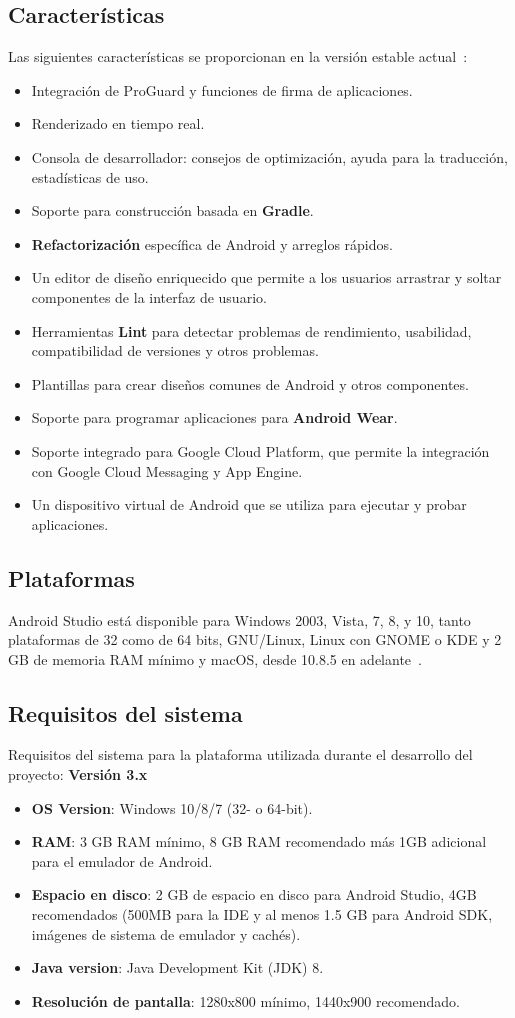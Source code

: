 \subsection{Características}
Las siguientes características se proporcionan en la versión estable actual~\cite{wiki:androidStudio}:
\begin{itemize}
	\item Integración de ProGuard y funciones de firma de aplicaciones.
	\item Renderizado en tiempo real.
	\item Consola de desarrollador: consejos de optimización, ayuda para la traducción, estadísticas de uso.
	\item Soporte para construcción basada en \textbf{Gradle}.
	\item \textbf{Refactorización} específica de Android y arreglos rápidos.
	\item Un editor de diseño enriquecido que permite a los usuarios arrastrar y soltar componentes de la interfaz de usuario.
	\item Herramientas \textbf{Lint} para detectar problemas de rendimiento, usabilidad, compatibilidad de versiones y otros problemas.
	\item Plantillas para crear diseños comunes de Android y otros componentes.
	\item Soporte para programar aplicaciones para \textbf{Android Wear}.
	\item Soporte integrado para Google Cloud Platform, que permite la integración con Google Cloud Messaging y App Engine.
	\item Un dispositivo virtual de Android que se utiliza para ejecutar y probar aplicaciones.
\end{itemize}
\subsection{Plataformas}
Android Studio está disponible para Windows 2003, Vista, 7, 8, y 10, tanto plataformas de 32 como de 64 bits, GNU/Linux, Linux con GNOME o KDE y 2 GB de memoria RAM mínimo y macOS, desde 10.8.5 en adelante~\cite{wiki:androidStudio}.
\subsection{Requisitos del sistema}
 Requisitos del sistema para la plataforma utilizada durante el desarrollo del proyecto: \textbf{Versión 3.x}~\cite{wiki:androidStudio}
 \begin{itemize}
 	\item\textbf{OS Version}: Windows 10/8/7 (32- o 64-bit). 
 	\item\textbf{RAM}: 3 GB RAM mínimo, 8 GB RAM recomendado más 1GB adicional para el emulador de Android.
 	\item\textbf{Espacio en disco}: 2 GB de espacio en disco para Android Studio, 4GB recomendados (500MB para la IDE y al menos 1.5 GB para Android SDK, imágenes de sistema de emulador y cachés).
 	\item\textbf{Java version}: Java Development Kit (JDK) 8.
 	\item\textbf{Resolución de pantalla}: 1280x800 mínimo, 1440x900 recomendado.
 \end{itemize}
